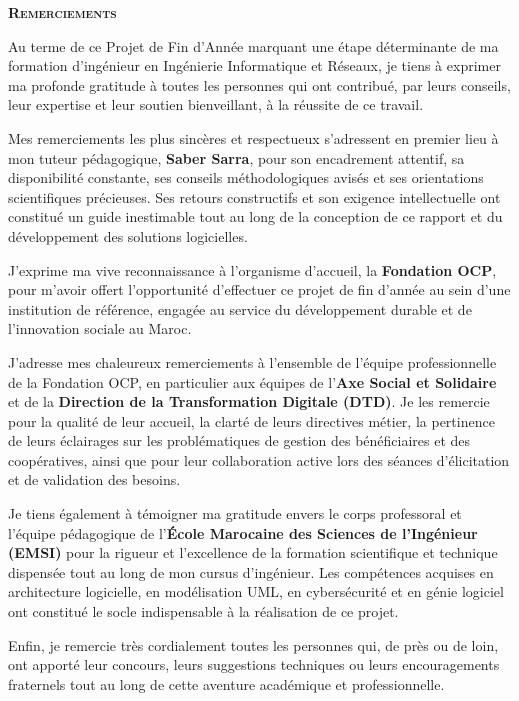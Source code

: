 \thispagestyle{empty}
\begin{center}
    \vspace*{1.2cm}
    {\Large\bfseries\scshape\color{focpgreendark} Remerciements}
    \vspace{0.8cm}
\end{center}

Au terme de ce Projet de Fin d'Année marquant une étape déterminante de ma formation d'ingénieur en Ingénierie Informatique et Réseaux, je tiens à exprimer ma profonde gratitude à toutes les personnes qui ont contribué, par leurs conseils, leur expertise et leur soutien bienveillant, à la réussite de ce travail.

Mes remerciements les plus sincères et respectueux s'adressent en premier lieu à mon tuteur pédagogique, \textbf{Saber Sarra}, pour son encadrement attentif, sa disponibilité constante, ses conseils méthodologiques avisés et ses orientations scientifiques précieuses. Ses retours constructifs et son exigence intellectuelle ont constitué un guide inestimable tout au long de la conception de ce rapport et du développement des solutions logicielles.

J'exprime ma vive reconnaissance à l'organisme d'accueil, la \textbf{Fondation OCP}, pour m'avoir offert l'opportunité d'effectuer ce projet de fin d'année au sein d'une institution de référence, engagée au service du développement durable et de l'innovation sociale au Maroc.

J'adresse mes chaleureux remerciements à l'ensemble de l'équipe professionnelle de la Fondation OCP, en particulier aux équipes de l'\textbf{Axe Social et Solidaire} et de la \textbf{Direction de la Transformation Digitale (DTD)}. Je les remercie pour la qualité de leur accueil, la clarté de leurs directives métier, la pertinence de leurs éclairages sur les problématiques de gestion des bénéficiaires et des coopératives, ainsi que pour leur collaboration active lors des séances d'élicitation et de validation des besoins.

Je tiens également à témoigner ma gratitude envers le corps professoral et l'équipe pédagogique de l'\textbf{École Marocaine des Sciences de l'Ingénieur (EMSI)} pour la rigueur et l'excellence de la formation scientifique et technique dispensée tout au long de mon cursus d'ingénieur. Les compétences acquises en architecture logicielle, en modélisation UML, en cybersécurité et en génie logiciel ont constitué le socle indispensable à la réalisation de ce projet.

Enfin, je remercie très cordialement toutes les personnes qui, de près ou de loin, ont apporté leur concours, leurs suggestions techniques ou leurs encouragements fraternels tout au long de cette aventure académique et professionnelle.

\vfill
\newpage
